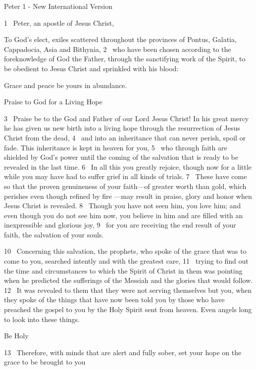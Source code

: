 

\centerline{   Peter 1 - New International Version }

\par
1  Peter, an apostle of Jesus Christ,
\par
To God’s elect,
exiles
scattered
throughout the provinces of Pontus,
Galatia,
Cappadocia, Asia and Bithynia,
2  who have been chosen according to the foreknowledge
of God the Father, through the sanctifying work of the Spirit,
to be obedient
to Jesus Christ and sprinkled with his blood:
\par
Grace and peace be yours in abundance.
{\par
Praise to God for a Living Hope
}
\par
3  Praise be to the God and Father of our Lord Jesus Christ!
In his great mercy
he has given us new birth
into a living hope
through the resurrection of Jesus Christ from the dead,
4  and into an inheritance
that can never perish, spoil or fade.
This inheritance is kept in heaven for you,
5  who through faith are shielded by God’s power
until the coming of the salvation
that is ready to be revealed
in the last time.
6  In all this you greatly rejoice,
though now for a little while
you may have had to suffer grief in all kinds of trials.
7  These have come so that the proven genuineness
of your faith—of greater worth than gold, which perishes even though refined by fire
—may result in praise, glory and honor
when Jesus Christ is revealed.
8  Though you have not seen him, you love him; and even though you do not see him now, you believe in him
and are filled with an inexpressible and glorious joy,
9  for you are receiving the end result of your faith, the salvation of your souls.
\par
10  Concerning this salvation, the prophets, who spoke
of the grace that was to come to you,
searched intently and with the greatest care,
11  trying to find out the time and circumstances to which the Spirit of Christ
in them was pointing when he predicted
the sufferings of the Messiah and the glories that would follow.
12  It was revealed to them that they were not serving themselves but you,
when they spoke of the things that have now been told you by those who have preached the gospel to you
by the Holy Spirit sent from heaven.
Even angels long to look into these things.
{\par
Be Holy
}
\par
13  Therefore, with minds that are alert and fully sober,
set your hope
on the grace to be brought to you
